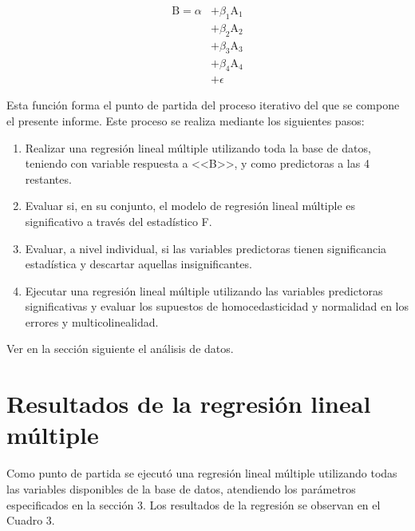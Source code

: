 \documentclass[a4paper,10pt]{article}\usepackage[]{graphicx}\usepackage[]{color}
\begin{document}
\begin{align*}
\mathrm{B}= \alpha 
    &+ \beta_{1}  \mathrm{A}_{1} \\
    &+ \beta_{2}  \mathrm{A}_{2}    \\
    &+ \beta_{3}  \mathrm{A}_{3} \\
    &+ \beta_{4}  \mathrm{A}_{4} \\
    &+ \epsilon
\end{align*}

Esta función forma el punto de partida del proceso iterativo del que se compone el presente informe. Este proceso se realiza mediante los siguientes pasos:
\begin{enumerate}
  \item Realizar una regresión lineal múltiple utilizando toda la base de datos, teniendo con variable respuesta a <<B>>, y como predictoras a las 4 restantes.
  \item Evaluar si, en su conjunto, el modelo de regresión lineal múltiple es significativo a través del estadístico F.
  \item Evaluar, a nivel individual, si las variables predictoras tienen significancia estadística y descartar aquellas insignificantes.
  \item Ejecutar una regresión lineal múltiple utilizando las variables predictoras significativas y evaluar los supuestos de homocedasticidad y normalidad en los errores y multicolinealidad.
\end{enumerate}

Ver en la sección siguiente el análisis de datos.

\section{Resultados de la regresión lineal múltiple}

Como punto de partida se ejecutó una regresión lineal múltiple utilizando todas las variables disponibles de la base de datos, atendiendo los parámetros especificados en la sección 3. Los resultados de la regresión se observan en el Cuadro 3.
\end{document}
